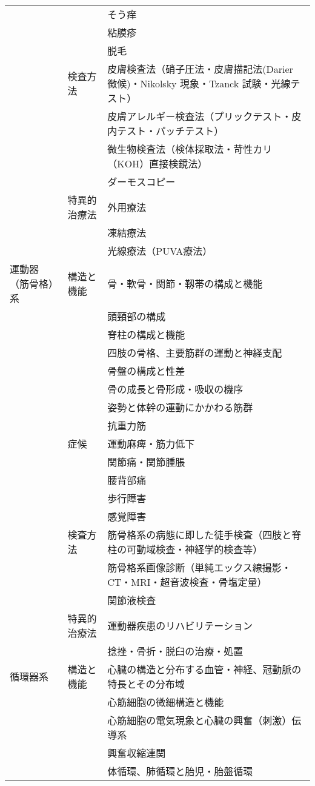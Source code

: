 \begin{xltabular}{\linewidth}{XXX}
 &  & そう痒 \\
 &  & 粘膜疹 \\
 &  & 脱毛 \\
 & 検査方法 & 皮膚検査法（硝子圧法・皮膚描記法(Darier 徴候)・Nikolsky 現象・Tzanck 試験・光線テスト） \\
 &  & 皮膚アレルギー検査法（プリックテスト・皮内テスト・パッチテスト） \\
 &  & 微生物検査法（検体採取法・苛性カリ（KOH）直接検鏡法） \\
 &  & ダーモスコピー \\
 & 特異的治療法 & 外用療法 \\
 &  & 凍結療法 \\
 &  & 光線療法（PUVA療法） \\
運動器（筋骨格）系 & 構造と機能 & 骨・軟骨・関節・靱帯の構成と機能 \\
 &  & 頭頸部の構成 \\
 &  & 脊柱の構成と機能 \\
 &  & 四肢の骨格、主要筋群の運動と神経支配 \\
 &  & 骨盤の構成と性差 \\
 &  & 骨の成長と骨形成・吸収の機序 \\
 &  & 姿勢と体幹の運動にかかわる筋群 \\
 &  & 抗重力筋 \\
 & 症候 & 運動麻痺・筋力低下 \\
 &  & 関節痛・関節腫脹 \\
 &  & 腰背部痛 \\
 &  & 歩行障害 \\
 &  & 感覚障害 \\
 & 検査方法 & 筋骨格系の病態に即した徒手検査（四肢と脊柱の可動域検査・神経学的検査等） \\
 &  & 筋骨格系画像診断（単純エックス線撮影・CT・MRI・超音波検査・骨塩定量） \\
 &  & 関節液検査 \\
 & 特異的治療法 & 運動器疾患のリハビリテーション \\
 &  & 捻挫・骨折・脱臼の治療・処置 \\
循環器系 & 構造と機能 & 心臓の構造と分布する血管・神経、冠動脈の特長とその分布域 \\
 &  & 心筋細胞の微細構造と機能 \\
 &  & 心筋細胞の電気現象と心臓の興奮（刺激）伝導系 \\
 &  & 興奮収縮連関 \\
 &  & 体循環、肺循環と胎児・胎盤循環 \\

\end{xltabular}

